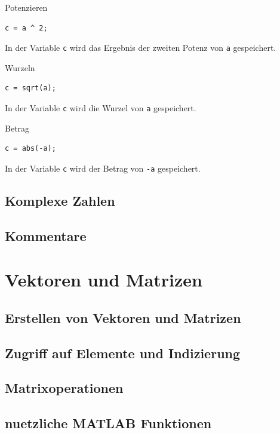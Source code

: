 \documentclass[12pt, a4paper, twoside]{article}
\begin{document}
                \begin{CodeErklaerungBox}{Potenzieren}
                \begin{lstlisting}
c = a ^ 2;
                \end{lstlisting}
                \tcblower
                In der Variable \texttt{c} wird das Ergebnis der zweiten Potenz von \texttt{a} gespeichert.
                \end{CodeErklaerungBox}
                \begin{CodeErklaerungBox}{Wurzeln}
                \begin{lstlisting}
c = sqrt(a);
                \end{lstlisting}
                \tcblower
                In der Variable \texttt{c} wird die Wurzel von \texttt{a} gespeichert.
                \end{CodeErklaerungBox}
                \begin{CodeErklaerungBox}{Betrag}
                \begin{lstlisting}
c = abs(-a);
                \end{lstlisting}
                \tcblower
                In der Variable \texttt{c} wird der Betrag von \texttt{-a} gespeichert.
                \end{CodeErklaerungBox}
        \subsection{Komplexe Zahlen}
        \subsection{Kommentare}
    \section{Vektoren und Matrizen}
        \subsection{Erstellen von Vektoren und Matrizen}
        \subsection{Zugriff auf Elemente und Indizierung}
        \subsection{Matrixoperationen}
        \subsection{nuetzliche MATLAB Funktionen}
\end{document}
